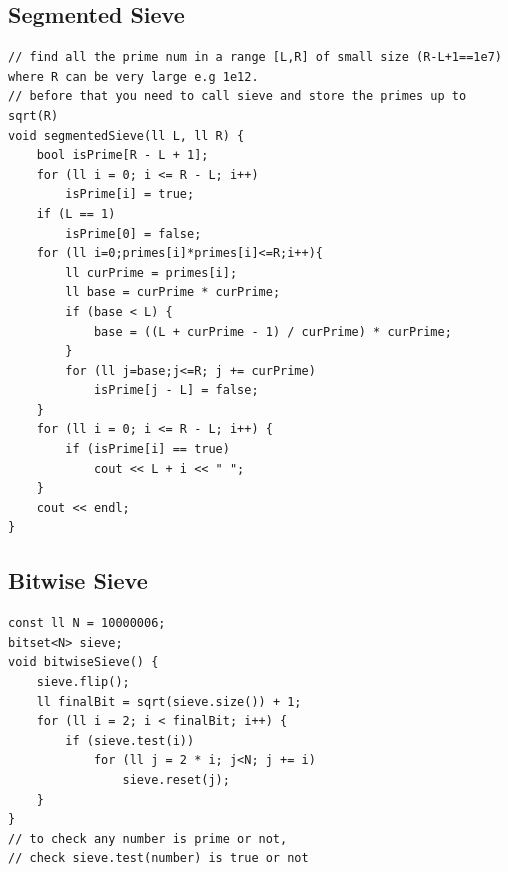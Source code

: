\subsection{Segmented Sieve}
\begin{lstlisting}
// find all the prime num in a range [L,R] of small size (R-L+1==1e7) where R can be very large e.g 1e12.
// before that you need to call sieve and store the primes up to sqrt(R)
void segmentedSieve(ll L, ll R) {
    bool isPrime[R - L + 1];
    for (ll i = 0; i <= R - L; i++)
        isPrime[i] = true;
    if (L == 1)
        isPrime[0] = false;
    for (ll i=0;primes[i]*primes[i]<=R;i++){
        ll curPrime = primes[i];
        ll base = curPrime * curPrime;
        if (base < L) {
            base = ((L + curPrime - 1) / curPrime) * curPrime;
        }
        for (ll j=base;j<=R; j += curPrime)
            isPrime[j - L] = false;
    }
    for (ll i = 0; i <= R - L; i++) {
        if (isPrime[i] == true)
            cout << L + i << " ";
    }
    cout << endl;
}
\end{lstlisting}
\subsection{Bitwise Sieve}
\begin{lstlisting}
const ll N = 10000006;
bitset<N> sieve;
void bitwiseSieve() {
    sieve.flip();
    ll finalBit = sqrt(sieve.size()) + 1;
    for (ll i = 2; i < finalBit; i++) {
        if (sieve.test(i))
            for (ll j = 2 * i; j<N; j += i)
                sieve.reset(j);
    }
}
// to check any number is prime or not,
// check sieve.test(number) is true or not
\end{lstlisting}
